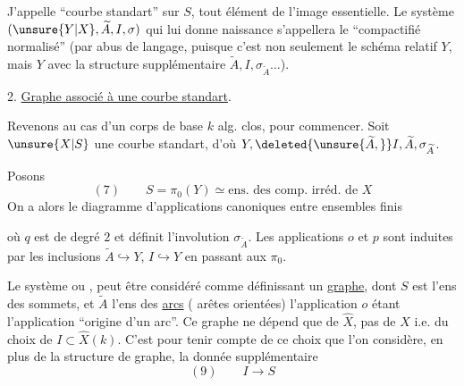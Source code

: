 J'appelle ``courbe  standart'' sur $S$, tout élément de l'image essentielle. Le système $(\unsure{Y|X},\widetilde A,I,\sigma)$ qui lui donne naissance s'appellera le ``compactifié normalisé''  (par abus de  langage, puisque c'est non seulement le schéma relatif $Y$, mais $Y$ avec la structure supplémentaire $\widetilde A,I,\sigma_{\widetilde A}\ldots$).

2. \uline{Graphe associé à une courbe standart}.

Revenons au cas d'un corps de base $k$ alg. clos, pour commencer. Soit $\unsure{X|S}$ une courbe standart, d'où $Y,\deleted{\unsure{\widetilde A,}}I,\widetilde A,\sigma_{\widetilde A}$.

Posons
\[
(7)\qquad S=\pi_0(Y)\simeq\text{ens. des comp. irréd. de }X
\]
On a alors le diagramme d'applications canoniques entre ensembles finis

où $q$ est de degré $2$ et définit l'involution $\sigma_{\widetilde A}$. Les applications $o$ et $p$ sont induites par les inclusions $\widetilde A\hookrightarrow Y$, $I\hookrightarrow Y$ en passant aux $\pi_0$.

Le système
ou
, peut être considéré comme définissant un \uline{graphe}, dont $S$ est l'ens des sommets, et $\widetilde A$ l'ens des \uline{arcs} ( arêtes orientées) l'application $o$ étant l'application ``origine d'un arc''. Ce graphe ne dépend que de $\widehat X$, pas de $X$ i.e. du choix de $I\subset\widehat X(k)$. C'est pour tenir compte de ce choix que l'on considère, en plus de la structure de graphe, la donnée supplémentaire
\[
(9)\qquad I\longrightarrow S
\]

